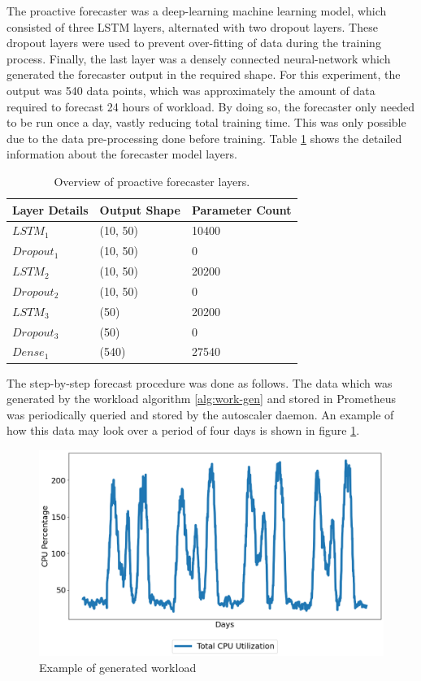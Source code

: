 The proactive forecaster was a deep-learning machine learning model, which consisted of three LSTM layers, alternated with two dropout layers. These dropout layers were used to prevent over-fitting of data during the training process. Finally, the last layer was a densely connected neural-network which generated the forecaster output in the required shape. For this experiment, the output was 540 data points, which was approximately the amount of data required to forecast 24 hours of workload. By doing so, the forecaster only needed to be run once a day, vastly reducing total training time. This was only possible due to the data pre-processing done before training. Table \ref{tab:lstm-layers} shows the detailed information about the forecaster model layers.\par

\begin{table}
    \caption{Overview of proactive forecaster layers.}\label{tab:lstm-layers}
    \centering
    \begin{tabular}{|l|l|l|}
        \hline
        Layer Details & Output Shape & Parameter Count\\
        \hline
        $LSTM_{1}$ & (10, 50) & 10400\\
        $Dropout_{1}$ & (10, 50) & 0\\
        $LSTM_{2}$ & (10, 50) & 20200\\
        $Dropout_{2}$ & (10, 50) & 0\\
        $LSTM_{3}$ & (50) & 20200\\
        $Dropout_{3}$ & (50) & 0\\
        $Dense_{1}$ & (540) & 27540\\
        \hline
    \end{tabular}
\end{table}

The step-by-step forecast procedure was done as follows. The data which was generated by the workload algorithm \ref{alg:work-gen} and stored in Prometheus was periodically queried and stored by the autoscaler daemon. An example of how this data may look over a period of four days is shown in figure \ref{fig:lstm-init-data}.

\begin{figure}[htb]
    \centering
    \caption{Example of generated workload}
    \label{fig:lstm-init-data}
    \includegraphics[width=1.0\linewidth]{Figures/LSTM-Initial-Data.png}
\end{figure}

